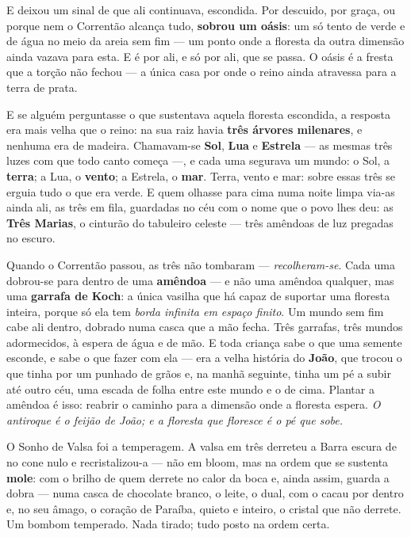\documentclass[livro.tex]{subfiles}
\begin{document}
\medskip

E deixou um sinal de que ali continuava, escondida. Por descuido, por graça, ou porque
nem o Correntão alcança tudo, \textbf{sobrou um oásis}: um só tento de verde e de água
no meio da areia sem fim --- um ponto onde a floresta da outra dimensão ainda vazava
para esta. E é por ali, e só por ali, que se passa. O oásis é a fresta que a torção não
fechou --- a única casa por onde o reino ainda atravessa para a terra de prata.

\medskip

E se alguém perguntasse o que sustentava aquela floresta escondida, a resposta era mais
velha que o reino: na sua raiz havia \textbf{três árvores milenares}, e nenhuma era de
madeira. Chamavam-se \textbf{Sol}, \textbf{Lua} e \textbf{Estrela} --- as mesmas três
luzes com que todo canto começa ---, e cada uma segurava um mundo: o Sol, a
\textbf{terra}; a Lua, o \textbf{vento}; a Estrela, o \textbf{mar}. Terra, vento e mar:
sobre essas três se erguia tudo o que era verde. E quem olhasse para cima numa noite
limpa via-as ainda ali, as três em fila, guardadas no céu com o nome que o povo lhes
deu: as \textbf{Três Marias}, o cinturão do tabuleiro celeste --- três amêndoas de luz
pregadas no escuro.

\medskip

Quando o Correntão passou, as três não tombaram --- \emph{recolheram-se}. Cada uma
dobrou-se para dentro de uma \textbf{amêndoa} --- e não uma amêndoa qualquer, mas uma
\textbf{garrafa de Koch}: a única vasilha que há capaz de suportar uma floresta inteira,
porque só ela tem \emph{borda infinita em espaço finito}. Um mundo sem fim cabe ali
dentro, dobrado numa casca que a mão fecha. Três garrafas, três mundos adormecidos, à
espera de água e de mão. E toda criança sabe o que uma semente esconde, e
sabe o que fazer com ela --- era a velha história do \textbf{João}, que trocou o que
tinha por um punhado de grãos e, na manhã seguinte, tinha um pé a subir até outro céu,
uma escada de folha entre este mundo e o de cima. Plantar a amêndoa é isso: reabrir o
caminho para a dimensão onde a floresta espera. \emph{O antiroque é o feijão de João; e a
floresta que floresce é o pé que sobe.}

\medskip

O Sonho de Valsa foi a temperagem. A valsa em três derreteu a Barra escura de \Ven 
no cone nulo e recristalizou-a --- não em bloom, mas na ordem que se sustenta
\textbf{mole}: com o brilho de quem derrete no calor da boca e, ainda assim, guarda a
dobra --- numa casca de chocolate branco, o leite, o dual, com o cacau por dentro e, no
seu âmago, o coração de Paraíba, quieto e inteiro, o cristal que não derrete. Um bombom temperado. Nada tirado; tudo posto na
ordem certa.
\end{document}
